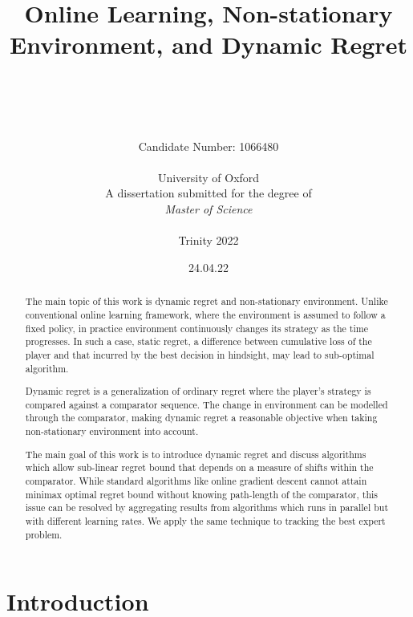 \documentclass[12pt, a4paper]{report}
\date{24.04.22}
\title{Online Learning, Non-stationary Environment, and Dynamic Regret}
\author{\\ 
\\
\\
\\ Candidate Number: 1066480
\\
\\ University of Oxford
\\
A dissertation submitted for the degree of \\ \textit{Master of Science}
\\ \\
Trinity 2022
\\ 
}
\begin{document}
\thispagestyle{headings}
	\maketitle
\FloatBarrier
{}

\thispagestyle{empty}
%
%
\begin{abstract}
The main topic of this work is dynamic regret and non-stationary environment. Unlike conventional online learning framework, where the environment is assumed to follow a fixed policy, in practice environment continuously changes its strategy as the time progresses. In such a case, static regret, a difference between cumulative loss of the player and that incurred by the best decision in hindsight, may lead to sub-optimal algorithm.

Dynamic regret is a generalization of ordinary regret where the player's strategy is compared against a comparator sequence. The change in environment can be modelled through the comparator, making dynamic regret a reasonable objective when taking non-stationary environment into account. 

The main goal of this work is to introduce dynamic regret and discuss algorithms which allow sub-linear regret bound that depends on a measure of shifts within the comparator. While standard algorithms like online gradient descent cannot attain minimax optimal regret bound without knowing path-length of the comparator, this issue can be resolved by aggregating results from algorithms which runs in parallel but with different learning rates. We apply the same technique to tracking the best expert problem. 

\end{abstract}
\tableofcontents


\chapter{Introduction}
\end{document}
